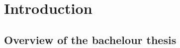 






\chapter{Introduction}  %

\ifpdf
    \graphicspath{{Chapter1/Figs/Raster/}{Chapter1/Figs/PDF/}{Chapter1/Figs/}}
\else
    \graphicspath{{Chapter1/Figs/Vector/}{Chapter1/Figs/}}
\fi


\section{Overview of the bachelour thesis } %


